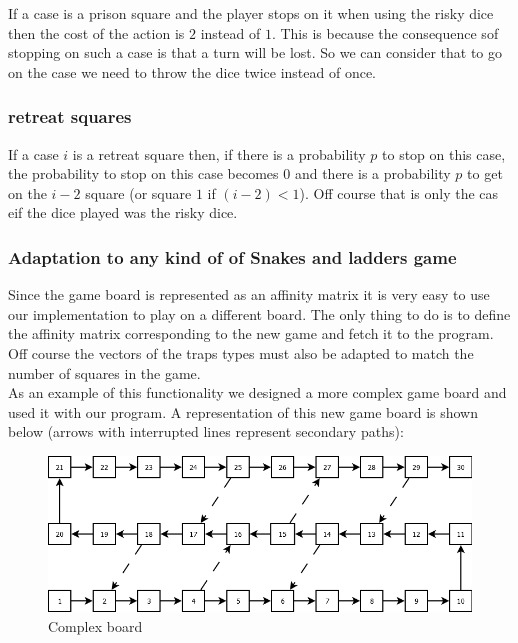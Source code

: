 \documentclass{eplDoc}
\begin{document}
If a case is a prison square and the player stops on it when using the risky dice then the cost of the action is $2$ instead of $1$. This is because the consequence sof stopping on such a case is that a turn will be lost. So we can consider that to go on the case we need to throw the dice twice instead of once. 

\subsubsection{retreat squares}

If a case $i$ is a retreat square then, if there is a probability $p$ to stop on this case,  the probability to stop on this case becomes $0$ and there is a probability $p$ to get on the  $i-2$ square (or square $1$ if $(i-2)<1$). Off course that is only the cas eif the dice played was the risky dice. 


\subsubsection{Adaptation to any kind of of Snakes and ladders game}

Since the game board is represented as an affinity matrix it is very easy to use our implementation to play on a different board. The only thing to do is to define the affinity matrix corresponding to the new game and fetch it to the program. Off course the vectors of the traps types must also be adapted to match the number of squares in the game. \\ 
As an example of this functionality we designed a more complex game board and used it with our program. A representation of this new game board is shown below (arrows with interrupted lines represent secondary paths): 

\FloatBarrier
\begin{figure}[h]%
	\includegraphics[width=\columnwidth]{newboard.png}%
	\caption{Complex board}%
	\label{newboard}%
\end{figure}
\FloatBarrier
 \ \\ 
\end{document}
